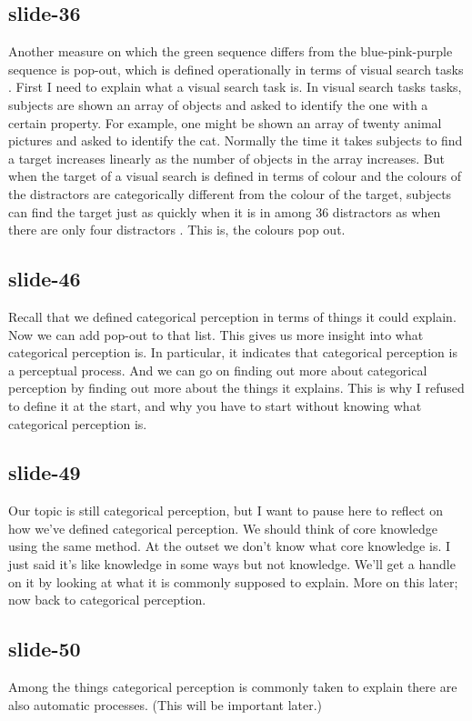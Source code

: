 \documentclass[12pt,\papersize]{extarticle}
\begin{document}
\subsection{slide-36}
Another measure on which the green sequence differs from the blue-pink-purple sequence is pop-out, which is defined operationally in terms of visual search tasks \citep[p.\ 117]{Treisman:1986pm}.
First I need to explain what a visual search task is.
In visual search tasks tasks, subjects are shown an array of objects and asked to identify the one with a certain property.
For example, one might be shown an array of twenty animal pictures and asked to identify the cat.
Normally the time it takes subjects to find a target increases linearly as the number of objects in the array increases.
But when the target of a visual search is defined in terms of colour and the colours of the distractors are categorically different from the colour of the target, subjects can find the target just as quickly when it is in among 36 distractors as when there are only four distractors \citep[Experiment 1]{Daoutis:2006qk}.
This is, the colours pop out.
 
 
\subsection{slide-46}
Recall that we defined categorical perception in terms of things it could explain.
Now we can add pop-out to that list.
This gives us more insight into what categorical perception is.
In particular, it indicates that categorical perception is a perceptual process.
And we can go on finding out more about categorical perception by finding out more about the things it explains.
This is why I refused to define it at the start, and why you have to start without knowing what categorical perception is.
 
 
\subsection{slide-49}
Our topic is still categorical perception, but I want to pause here to reflect on how we've defined categorical perception.
We should think of core knowledge using the same method.
At the outset we don't know what core knowledge is.
I just said it's like knowledge in some ways but not knowledge.
We'll get a handle on it by looking at what it is commonly supposed to explain.
More on this later; now back to categorical perception.
 
 
\subsection{slide-50}
Among the things categorical perception is commonly taken to explain there are also automatic processes.
(This will be important later.)
 
\end{document}
